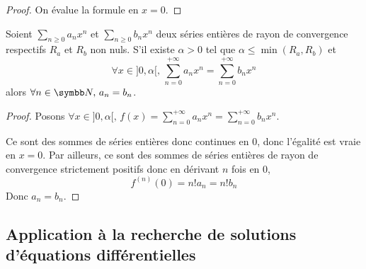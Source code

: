 \begin{proof}
    On évalue la formule en $x = 0$. 
\end{proof}

\begin{corollaire}{}{}
    Soient $\sum_{n \geqslant 0} a_n x^n$ et $\sum_{n \geqslant 0} b_n x^n$ deux séries entières
    de rayon de convergence respectifs $R_a$ et $R_b$ non nuls. S'il existe $\alpha > 0$ tel que 
    $\alpha \leqslant \min(R_a, R_b)$ et 
    \[\forall x \in ]0, \alpha[, \, \sum_{n = 0}^{+\infty} a_n x^n = \sum_{n = 0}^{+\infty} b_n x^n\]
    alors $\forall n \in \N, \, a_n = b_n$.
\end{corollaire}

\begin{proof}
    Posons $\displaystyle \forall x \in ]0, \alpha[, \, f(x) = \sum_{n = 0}^{+\infty} a_n x^n = \sum_{n = 0}^{+\infty} b_n x^n$. 

    Ce sont des sommes de séries entières donc continues en $0$, donc l'égalité est vraie en 
    $x = 0$. Par ailleurs, ce sont des sommes de séries entières de rayon de convergence 
    strictement positifs donc en dérivant $n$ fois en $0$, 
    \[f^{(n)}(0) = n ! a_n = n! b_n\]
    Donc $a_n = b_n$.
\end{proof}

\subsection{Application à la recherche de solutions d'équations différentielles}

